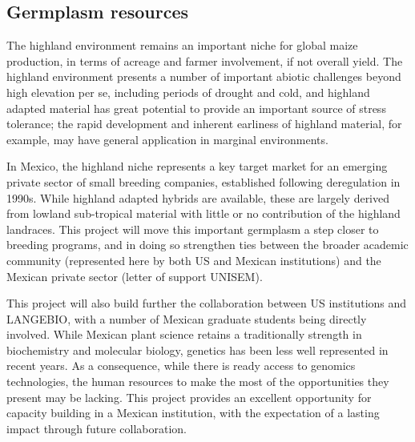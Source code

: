 \subsection*{Germplasm resources} %


The highland environment remains an important niche for global maize production, in terms of acreage and farmer involvement, if not overall yield. The highland environment presents a number of important abiotic challenges beyond high elevation per se, including periods of drought and cold, and highland adapted material has great potential to provide an important source of stress tolerance; the rapid development and inherent earliness of highland material, for example, may have general application in marginal environments. 

In Mexico, the highland niche represents a key target market for an emerging private sector of small breeding companies, established following deregulation in 1990s. While highland adapted hybrids are available, these are largely derived from lowland sub-tropical material with little or no contribution of the highland landraces. This project will move this important germplasm a step closer to breeding programs, and in doing so strengthen ties between the broader academic community (represented here by both US and Mexican institutions) and the Mexican private sector (letter of support UNISEM).

This project will also build further the collaboration between US institutions and LANGEBIO, with a number of Mexican graduate students being directly involved. While Mexican plant science retains a traditionally strength in biochemistry and molecular biology, genetics has been less well represented in recent years. As a consequence, while there is ready access to genomics technologies, the human resources to make the most of the opportunities they present may be lacking. This project provides an excellent opportunity for capacity building in a Mexican institution, with the expectation of a lasting impact through future collaboration.



